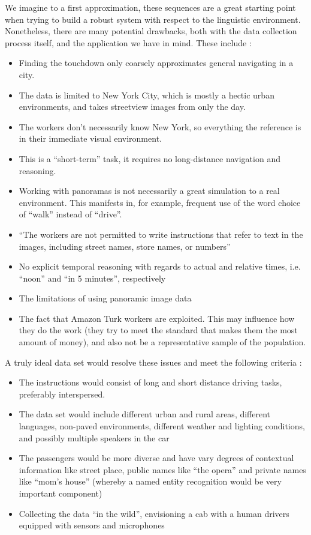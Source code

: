 \documentclass{article}
\begin{document}
We imagine to a first approximation, these sequences are a great starting point
when trying to build a robust system with respect to the linguistic environment.
Nonetheless, there are many potential drawbacks, both with the data collection
process itself, and the application we have in mind. These include :

\begin{itemize}
\item Finding the touchdown only coarsely approximates general navigating in a city.
\item The data is limited to New York City, which is mostly a hectic urban environments,
 and takes streetview images from only the day.
\item The workers don't necessarily know New York, so everything the reference is in their immediate
 visual environment.
\item This is a ``short-term'' task, it requires no long-distance navigation
 and reasoning.
\item Working with panoramas is not necessarily a great simulation to a real
 environment. This manifests in, for example, frequent use of the word choice
 of ``walk'' instead of ``drive''.
\item ``The workers are not permitted to write instructions that refer to text in the
images, including street names, store names, or numbers''  \cite{chen2019touchdown}
\item No explicit temporal reasoning with regards to actual and relative times,
 i.e. ``noon'' and ``in 5 minutes'', respectively
\item The limitations of using panoramic image data
\item The fact that Amazon Turk workers are exploited. This may influence how they
 do the work (they try to meet the standard that makes them the most amount of
 money), and also not be a representative sample of the population.
\end{itemize}

A truly ideal data set would resolve these issues and meet the following
criteria :

\begin{itemize}
\item The instructions would consist of long and short distance driving tasks,
 preferably interspersed.
\item The data set would include different urban and rural areas, different
 languages, non-paved environments, different weather and lighting conditions, and possibly multiple speakers in the car
\item The passengers would be more diverse and have vary degrees of contextual
 information like street place, public names like ``the opera'' and
 private names like ``mom's house'' (whereby a named entity recognition would
 be very important component)
\item Collecting the data ``in the wild'', envisioning a cab with a human
 drivers equipped with sensors and microphones
\end{itemize}
\end{document}

